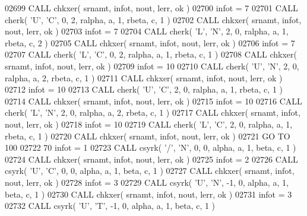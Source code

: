 \begin{DoxyCode}
02699       \textcolor{keyword}{CALL }chkxer( srnamt, infot, nout, lerr, ok )
02700       infot = 7
02701       \textcolor{keyword}{CALL }cherk( \textcolor{stringliteral}{'U'}, \textcolor{stringliteral}{'C'}, 0, 2, ralpha, a, 1, rbeta, c, 1 )
02702       \textcolor{keyword}{CALL }chkxer( srnamt, infot, nout, lerr, ok )
02703       infot = 7
02704       \textcolor{keyword}{CALL }cherk( \textcolor{stringliteral}{'L'}, \textcolor{stringliteral}{'N'}, 2, 0, ralpha, a, 1, rbeta, c, 2 )
02705       \textcolor{keyword}{CALL }chkxer( srnamt, infot, nout, lerr, ok )
02706       infot = 7
02707       \textcolor{keyword}{CALL }cherk( \textcolor{stringliteral}{'L'}, \textcolor{stringliteral}{'C'}, 0, 2, ralpha, a, 1, rbeta, c, 1 )
02708       \textcolor{keyword}{CALL }chkxer( srnamt, infot, nout, lerr, ok )
02709       infot = 10
02710       \textcolor{keyword}{CALL }cherk( \textcolor{stringliteral}{'U'}, \textcolor{stringliteral}{'N'}, 2, 0, ralpha, a, 2, rbeta, c, 1 )
02711       \textcolor{keyword}{CALL }chkxer( srnamt, infot, nout, lerr, ok )
02712       infot = 10
02713       \textcolor{keyword}{CALL }cherk( \textcolor{stringliteral}{'U'}, \textcolor{stringliteral}{'C'}, 2, 0, ralpha, a, 1, rbeta, c, 1 )
02714       \textcolor{keyword}{CALL }chkxer( srnamt, infot, nout, lerr, ok )
02715       infot = 10
02716       \textcolor{keyword}{CALL }cherk( \textcolor{stringliteral}{'L'}, \textcolor{stringliteral}{'N'}, 2, 0, ralpha, a, 2, rbeta, c, 1 )
02717       \textcolor{keyword}{CALL }chkxer( srnamt, infot, nout, lerr, ok )
02718       infot = 10
02719       \textcolor{keyword}{CALL }cherk( \textcolor{stringliteral}{'L'}, \textcolor{stringliteral}{'C'}, 2, 0, ralpha, a, 1, rbeta, c, 1 )
02720       \textcolor{keyword}{CALL }chkxer( srnamt, infot, nout, lerr, ok )
02721       \textcolor{keywordflow}{GO TO} 100
02722    70 infot = 1
02723       \textcolor{keyword}{CALL }csyrk( \textcolor{stringliteral}{'/'}, \textcolor{stringliteral}{'N'}, 0, 0, alpha, a, 1, beta, c, 1 )
02724       \textcolor{keyword}{CALL }chkxer( srnamt, infot, nout, lerr, ok )
02725       infot = 2
02726       \textcolor{keyword}{CALL }csyrk( \textcolor{stringliteral}{'U'}, \textcolor{stringliteral}{'C'}, 0, 0, alpha, a, 1, beta, c, 1 )
02727       \textcolor{keyword}{CALL }chkxer( srnamt, infot, nout, lerr, ok )
02728       infot = 3
02729       \textcolor{keyword}{CALL }csyrk( \textcolor{stringliteral}{'U'}, \textcolor{stringliteral}{'N'}, -1, 0, alpha, a, 1, beta, c, 1 )
02730       \textcolor{keyword}{CALL }chkxer( srnamt, infot, nout, lerr, ok )
02731       infot = 3
02732       \textcolor{keyword}{CALL }csyrk( \textcolor{stringliteral}{'U'}, \textcolor{stringliteral}{'T'}, -1, 0, alpha, a, 1, beta, c, 1 )

\end{DoxyCode}
